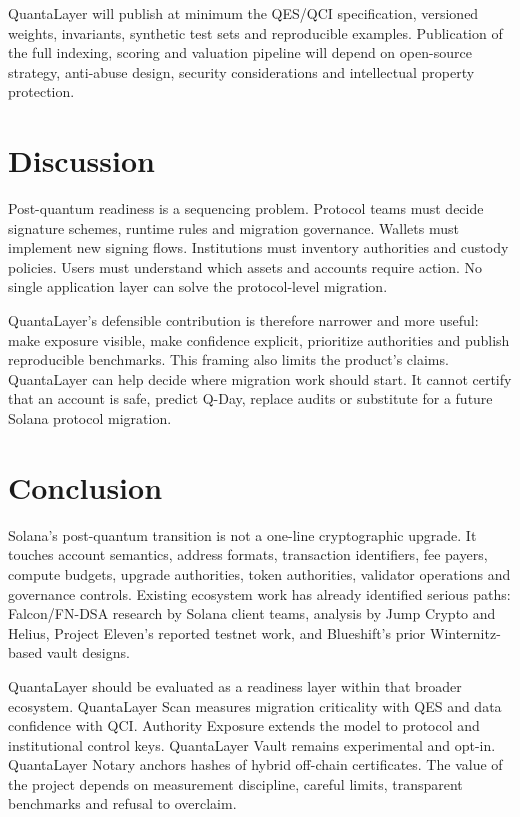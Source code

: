 \documentclass[11pt,a4paper,oneside,parskip=false]{scrartcl}
\newcommand{\QES}{\textsc{QES}}
\newcommand{\QCI}{\textsc{QCI}}
\begin{document}
QuantaLayer will publish at minimum the \QES{}/\QCI{} specification, versioned weights, invariants, synthetic test sets and reproducible examples. Publication of the full indexing, scoring and valuation pipeline will depend on open-source strategy, anti-abuse design, security considerations and intellectual property protection.

\section{Discussion}

Post-quantum readiness is a sequencing problem. Protocol teams must decide signature schemes, runtime rules and migration governance. Wallets must implement new signing flows. Institutions must inventory authorities and custody policies. Users must understand which assets and accounts require action. No single application layer can solve the protocol-level migration.

QuantaLayer's defensible contribution is therefore narrower and more useful: make exposure visible, make confidence explicit, prioritize authorities and publish reproducible benchmarks. This framing also limits the product's claims. QuantaLayer can help decide where migration work should start. It cannot certify that an account is safe, predict Q-Day, replace audits or substitute for a future Solana protocol migration.

\section{Conclusion}

Solana's post-quantum transition is not a one-line cryptographic upgrade. It touches account semantics, address formats, transaction identifiers, fee payers, compute budgets, upgrade authorities, token authorities, validator operations and governance controls. Existing ecosystem work has already identified serious paths: Falcon/FN-DSA research by Solana client teams, analysis by Jump Crypto and Helius, Project Eleven's reported testnet work, and Blueshift's prior Winternitz-based vault designs.

QuantaLayer should be evaluated as a readiness layer within that broader ecosystem. QuantaLayer Scan measures migration criticality with \QES{} and data confidence with \QCI{}. Authority Exposure extends the model to protocol and institutional control keys. QuantaLayer Vault remains experimental and opt-in. QuantaLayer Notary anchors hashes of hybrid off-chain certificates. The value of the project depends on measurement discipline, careful limits, transparent benchmarks and refusal to overclaim.
\end{document}
